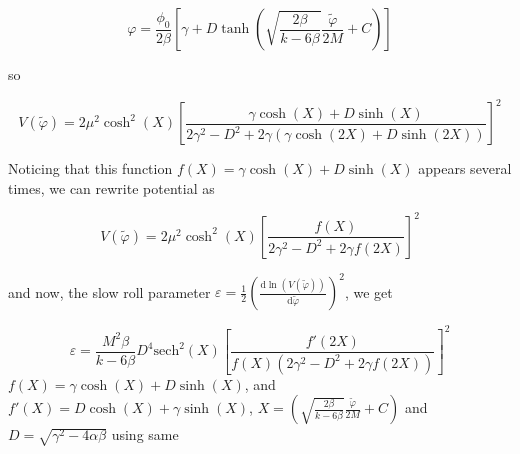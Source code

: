 \documentclass{article}
\begin{document}
\begin{equation}
    \varphi = \frac{\phi_0}{2 \beta} \left[ \gamma + D\tanh \left( \sqrt{\frac{2\beta}{k-6\beta}} \frac{\tilde{\varphi}}{2M} + C \right) \right]
\end{equation}

so

\begin{equation}
    V(\tilde{\varphi}) =  2\mu^2 \cosh^2(X)  \left [ \frac{\gamma \cosh(X)  + D \sinh(X) }{2\gamma^2 - D^2 + 2\gamma(\gamma \cosh(2X)  + D \sinh(2X))} \right]^2
\end{equation}

Noticing that this function $f(X) = \gamma \cosh(X)  + D \sinh(X)$ appears several times, we can rewrite potential as 

\begin{equation}
    V(\tilde{\varphi}) =  2\mu^2 \cosh^2(X)  \left [ \frac{f(X) }{2\gamma^2 - D^2 + 2\gamma f(2X)} \right]^2
\end{equation}

and now, the slow roll parameter $\varepsilon = \frac{1}{2} (\frac{\text{d}\ln(V(\tilde{\varphi}))}{\text{d}\tilde{\varphi}})^2$, we get

\begin{equation}
    \varepsilon = \frac{M^2 \beta}{k-6\beta} D^4 \text{sech}^2(X) \left[ \frac{f'(2X)}{f(X)(2\gamma^2 - D^2 + 2\gamma f(2X))} \right]^2
\end{equation}
$f(X) = \gamma \cosh(X)  + D \sinh(X)$, and $f'(X) = D \cosh(X)  + \gamma \sinh(X)$, $X = \left( \sqrt{\frac{2\beta}{k-6\beta}} \frac{\tilde{\varphi}}{2M} + C \right)$ and $D = \sqrt{\gamma^2-4\alpha\beta}$
using same 

\end{document}
